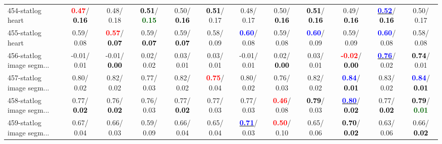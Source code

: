 \begin{table}[h]
\begin{center}
{\begin{tabular}{lc|c|c|c|c|c|c|c|c|c|c}
454-statlog heart & \textcolor{red}{\textbf{  0.47}}/\textcolor{black}{\textbf{  0.16}} &   0.48/  0.18 & \textcolor{black}{\textbf{  0.51}}/\textcolor{darkgreen}{\textbf{  0.15}} &   0.50/\textcolor{black}{\textbf{  0.16}} & \textcolor{black}{\textbf{  0.51}}/  0.17 &   0.48/  0.17 &   0.50/\textcolor{black}{\textbf{  0.16}} & \textcolor{black}{\textbf{  0.51}}/\textcolor{black}{\textbf{  0.16}} &   0.49/\textcolor{black}{\textbf{  0.16}} & \underline{\textcolor{blue}{\textbf{  0.52}}}/\textcolor{black}{\textbf{  0.16}} &   0.50/  0.17 \\
455-statlog heart &   0.59/  0.08 & \textcolor{red}{\textbf{  0.57}}/\textcolor{black}{\textbf{  0.07}} &   0.59/\textcolor{black}{\textbf{  0.07}} &   0.59/\textcolor{black}{\textbf{  0.07}} &   0.58/  0.09 & \textcolor{blue}{\textbf{  0.60}}/  0.08 &   0.59/  0.08 & \textcolor{blue}{\textbf{  0.60}}/  0.09 &   0.59/  0.09 & \textcolor{blue}{\textbf{  0.60}}/  0.08 &   0.58/  0.08 \\ \hline
456-statlog image segm... &  -0.01/  0.01 &  -0.01/\textcolor{black}{\textbf{  0.00}} &   0.02/  0.02 &   0.03/  0.01 &   0.03/  0.01 &  -0.01/  0.01 &   0.02/\textcolor{black}{\textbf{  0.00}} &   0.03/  0.01 & \textcolor{red}{\textbf{ -0.02}}/\textcolor{black}{\textbf{  0.00}} & \underline{\textcolor{blue}{\textbf{  0.76}}}/  0.02 & \textcolor{black}{\textbf{  0.74}}/  0.01 \\
457-statlog image segm... &   0.80/  0.02 &   0.82/  0.02 &   0.77/  0.03 &   0.82/  0.02 & \textcolor{red}{\textbf{  0.75}}/  0.04 &   0.80/  0.02 &   0.76/  0.03 &   0.82/  0.02 & \textcolor{blue}{\textbf{  0.84}}/\textcolor{black}{\textbf{  0.01}} &   0.83/  0.02 & \textcolor{blue}{\textbf{  0.84}}/\textcolor{black}{\textbf{  0.01}} \\
458-statlog image segm... &   0.77/\textcolor{black}{\textbf{  0.02}} &   0.76/\textcolor{black}{\textbf{  0.02}} &   0.76/  0.03 &   0.77/\textcolor{black}{\textbf{  0.02}} &   0.77/  0.03 &   0.77/  0.03 & \textcolor{red}{\textbf{  0.46}}/  0.08 & \textcolor{black}{\textbf{  0.79}}/  0.03 & \underline{\textcolor{blue}{\textbf{  0.80}}}/\textcolor{black}{\textbf{  0.02}} &   0.77/\textcolor{black}{\textbf{  0.02}} & \textcolor{black}{\textbf{  0.79}}/\textcolor{darkgreen}{\textbf{  0.01}} \\
459-statlog image segm... &   0.67/  0.04 &   0.66/  0.03 &   0.59/  0.09 &   0.66/  0.04 &   0.65/  0.04 & \underline{\textcolor{blue}{\textbf{  0.71}}}/  0.03 & \textcolor{red}{\textbf{  0.50}}/  0.10 &   0.65/  0.06 & \textcolor{black}{\textbf{  0.70}}/\textcolor{black}{\textbf{  0.02}} &   0.63/  0.06 &   0.66/\textcolor{black}{\textbf{  0.02}} \\

\end{tabular}}
\end{center}
\end{table}
